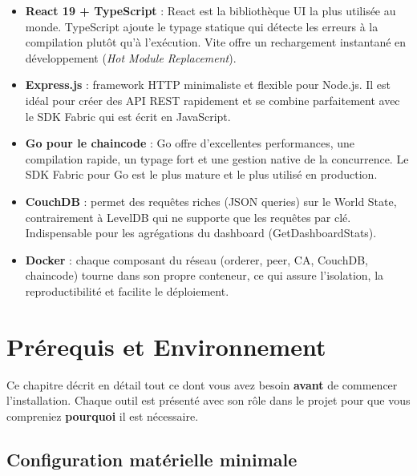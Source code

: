 \documentclass[12pt,a4paper,twoside]{report}
\begin{document}
\begin{itemize}
    \item \textbf{React 19 + TypeScript} : React est la bibliothèque UI la plus utilisée au monde. TypeScript ajoute le typage statique qui détecte les erreurs à la compilation plutôt qu'à l'exécution. Vite offre un rechargement instantané en développement (\textit{Hot Module Replacement}).
    
    \item \textbf{Express.js} : framework HTTP minimaliste et flexible pour Node.js. Il est idéal pour créer des API REST rapidement et se combine parfaitement avec le SDK Fabric qui est écrit en JavaScript.
    
    \item \textbf{Go pour le chaincode} : Go offre d'excellentes performances, une compilation rapide, un typage fort et une gestion native de la concurrence. Le SDK Fabric pour Go est le plus mature et le plus utilisé en production.
    
    \item \textbf{CouchDB} : permet des requêtes riches (JSON queries) sur le World State, contrairement à LevelDB qui ne supporte que les requêtes par clé. Indispensable pour les agrégations du dashboard (GetDashboardStats).
    
    \item \textbf{Docker} : chaque composant du réseau (orderer, peer, CA, CouchDB, chaincode) tourne dans son propre conteneur, ce qui assure l'isolation, la reproductibilité et facilite le déploiement.
\end{itemize}


\chapter{Prérequis et Environnement}

Ce chapitre décrit en détail tout ce dont vous avez besoin \textbf{avant} de commencer l'installation. Chaque outil est présenté avec son rôle dans le projet pour que vous compreniez \textbf{pourquoi} il est nécessaire.

\section{Configuration matérielle minimale}
\end{document}
